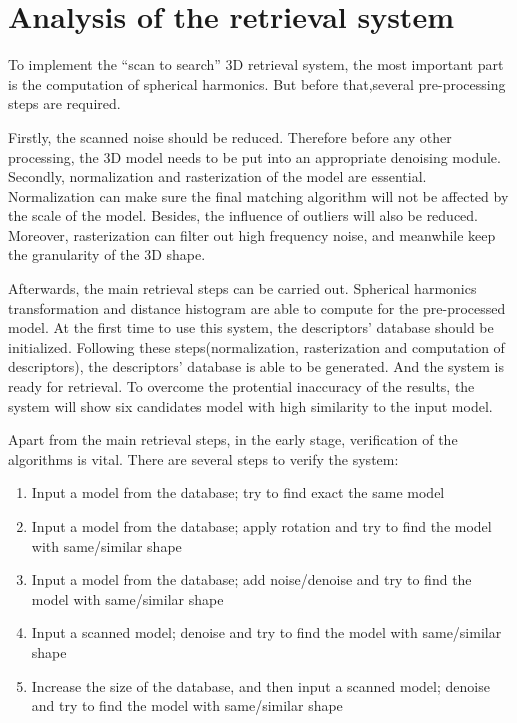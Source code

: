 \section{Analysis of the retrieval system}

To implement the ``scan to search'' 3D retrieval system, the most important part is the computation of spherical harmonics. But before that,several pre-processing steps are required. 

Firstly, the scanned noise should be reduced. Therefore before any other processing, the 3D model needs to be put into an appropriate denoising module. Secondly, normalization and rasterization of the model are essential. Normalization can make sure the final matching algorithm will not be affected by the scale of the model. Besides, the influence of outliers will also be reduced. Moreover, rasterization can filter out high frequency noise, and meanwhile keep the granularity of the 3D shape. 

Afterwards, the main retrieval steps can be carried out. Spherical harmonics transformation and distance histogram are able to compute for the pre-processed model. At the first time to use this system, the descriptors' database should be initialized. Following these steps(normalization, rasterization and computation of descriptors), the descriptors' database is able to be generated. And the system is ready for retrieval. To overcome the protential inaccuracy of the results, the system will show six candidates model with high similarity to the input model.

Apart from the main retrieval steps, in the early stage, verification of the algorithms is vital. There are several steps to verify the system: 

\begin{enumerate}[1)]
\item Input a model from the database; try to find exact the same model
\item Input a model from the database; apply rotation and try to find the model with same/similar shape
\item Input a model from the database; add noise/denoise and try to find the model with same/similar shape
\item Input a scanned model; denoise and try to find the model with same/similar shape
\item Increase the size of the database, and then input a scanned model; denoise and try to find the model with same/similar shape
\end{enumerate}

